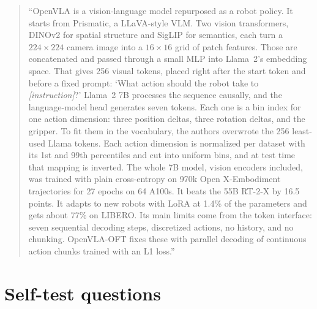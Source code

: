 \documentclass[11pt]{article}
\begin{document}
\begin{quote}
``OpenVLA is a vision-language model repurposed as a robot policy. It starts from Prismatic, a LLaVA-style VLM. Two vision transformers, DINOv2 for spatial structure and SigLIP for semantics, each turn a $224\times224$ camera image into a $16\times16$ grid of patch features. Those are concatenated and passed through a small MLP into Llama~2's embedding space. That gives 256 visual tokens, placed right after the start token and before a fixed prompt: `What action should the robot take to \textit{[instruction]}?' Llama~2 7B processes the sequence causally, and the language-model head generates seven tokens. Each one is a bin index for one action dimension: three position deltas, three rotation deltas, and the gripper. To fit them in the vocabulary, the authors overwrote the 256 least-used Llama tokens. Each action dimension is normalized per dataset with its 1st and 99th percentiles and cut into uniform bins, and at test time that mapping is inverted. The whole 7B model, vision encoders included, was trained with plain cross-entropy on 970k Open X-Embodiment trajectories for 27 epochs on 64 A100s. It beats the 55B RT-2-X by 16.5 points. It adapts to new robots with LoRA at 1.4\% of the parameters and gets about 77\% on LIBERO. Its main limits come from the token interface: seven sequential decoding steps, discretized actions, no history, and no chunking. OpenVLA-OFT fixes these with parallel decoding of continuous action chunks trained with an L1 loss.''
\end{quote}

\section{Self-test questions}
\end{document}
